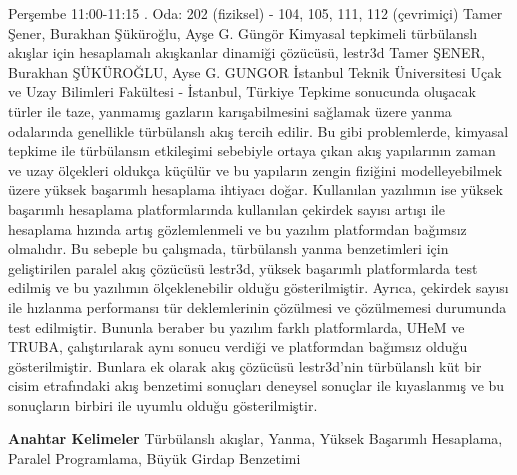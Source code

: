 
    \begin{abstract_basarim}
    {Perşembe 11:00-11:15}
    {.}
    {Oda: 202 (fiziksel) - 104, 105, 111, 112 (çevrimiçi)}
    {Tamer Şener, Burakhan Şüküroğlu, Ayşe G. Güngör}
    {Kimyasal tepkimeli türbülanslı akışlar için hesaplamalı akışkanlar dinamiği çözücüsü, lestr3d}
    {%
    Tamer ŞENER, Burakhan ŞÜKÜROĞLU, Ayse G. GUNGOR}
    {%
    }
    {%
    İstanbul Teknik Üniversitesi Uçak ve Uzay Bilimleri Fakültesi - İstanbul, Türkiye}
    Tepkime sonucunda oluşacak türler ile taze, yanmamış gazların karışabilmesini sağlamak üzere yanma odalarında genellikle türbülanslı akış tercih edilir. Bu gibi problemlerde, kimyasal tepkime ile türbülansın etkileşimi sebebiyle ortaya çıkan akış yapılarının zaman ve uzay ölçekleri oldukça küçülür ve bu yapıların zengin fiziğini modelleyebilmek üzere yüksek başarımlı hesaplama ihtiyacı doğar. Kullanılan yazılımın ise yüksek başarımlı hesaplama platformlarında kullanılan çekirdek sayısı artışı ile hesaplama hızında artış gözlemlenmeli ve bu yazılım platformdan bağımsız olmalıdır. Bu sebeple bu çalışmada, türbülanslı yanma benzetimleri için geliştirilen paralel akış çözücüsü lestr3d, yüksek başarımlı platformlarda test edilmiş ve bu yazılımın ölçeklenebilir olduğu gösterilmiştir. Ayrıca, çekirdek sayısı ile hızlanma performansı tür deklemlerinin çözülmesi ve çözülmemesi durumunda test edilmiştir. Bununla beraber bu yazılım farklı platformlarda, UHeM ve TRUBA, çalıştırılarak aynı sonucu verdiği ve platformdan bağımsız olduğu gösterilmiştir. Bunlara ek olarak akış çözücüsü lestr3d’nin türbülanslı küt bir cisim etrafındaki akış benzetimi sonuçları deneysel sonuçlar ile kıyaslanmış ve bu sonuçların birbiri ile uyumlu olduğu gösterilmiştir. 
    
            \textbf{Anahtar Kelimeler} \newline{}Türbülanslı akışlar, Yanma, Yüksek Başarımlı Hesaplama, Paralel Programlama, Büyük Girdap Benzetimi
    \end{abstract_basarim}
    